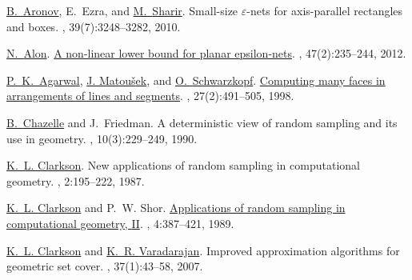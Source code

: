 \documentclass[12pt]{article}
\providecommand{\Erdos}{Erd{\H{o}}s\xspace}
\begin{document}
\providecommand{\Erdos}{Erd{\H o}s\xspace}
\begin{thebibliography}{MSW90}

\href{http://cis.poly.edu/~aronov/}{B.~{Aronov}}, E.~Ezra, and \href{http://www.math.tau.ac.il/~michas}{M.~{Sharir}}.
\newblock  Small-size $\varepsilon$-nets for axis-parallel rectangles and
  boxes.
, 39(7):3248--3282, 2010.

\href{http://www.math.tau.ac.il/~nogaa/}{N.~{Alon}}.
\newblock \href{http://dx.doi.org/10.1007/s00454-010-9323-7}{A non-linear lower
  bound for planar epsilon-nets}.
, 47(2):235--244, 2012.

\href{http://www.cs.duke.edu/~pankaj}{P.~K.~{Agarwal}}, \href{http://kam.mff.cuni.cz/~matousek}{J. Matou{\v s}ek}, and \href{http://www.win.tue.nl/~ocheong/}{O.~{Schwarzkopf}}.
\newblock \href{http://epubs.siam.org/sam-bin/dbq/article/26616}{Computing many
  faces in arrangements of lines and segments}.
, 27(2):491--505, 1998.

\href{http://www.cs.princeton.edu/~chazelle/}{B.~{Chazelle}} and J.~Friedman.
\newblock  A deterministic view of random sampling and its use in geometry.
, 10(3):229--249, 1990.

\href{http://cm.bell-labs.com/who/clarkson/}{K.~L. {Clarkson}}.
\newblock  New applications of random sampling in computational geometry.
, 2:195--222, 1987.

\href{http://cm.bell-labs.com/who/clarkson/}{K.~L. {Clarkson}} and P.~W. Shor.
\newblock \href{http://cm.bell-labs.com/who/clarkson/rs2m.html}{Applications of
  random sampling in computational geometry, {II}}.
, 4:387--421, 1989.

\href{http://cm.bell-labs.com/who/clarkson/}{K.~L. {Clarkson}} and \href{http://www.cs.uiowa.edu/~kvaradar/}{K.~R. {Varadarajan}}.
\newblock  Improved approximation algorithms for geometric set cover.
, 37(1):43--58, 2007.


\end{thebibliography}
\end{document}
